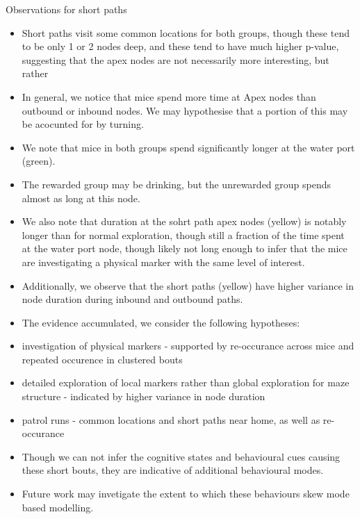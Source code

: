 Observations for short paths
\begin{itemize}
    \item Short paths visit some common locations for both groups, though these tend to be only 1 or 2 nodes deep, and these tend to have much higher p-value, suggesting that the apex nodes are not necessarily more interesting, but rather 
    \item In general, we notice that mice spend more time at Apex nodes than outbound or inbound nodes. We may hypothesise that a portion of this may be acocunted for by turning.
    \item We note that mice in both groups spend significantly longer at the water port (green).
    \item The rewarded group may be drinking, but the unrewarded group spends almost as long at this node.
    \item We also note that duration at the sohrt path apex nodes (yellow) is notably longer than for normal exploration, though still a fraction of the time spent at the water port node, though likely not long enough to infer that the mice are investigating a physical marker with the same level of interest.
    \item Additionally, we observe that the short paths (yellow) have higher variance in node duration during inbound and outbound paths. 
    \item The evidence accumulated, we consider the following hypotheses:
    \item investigation of physical markers - supported by re-occurance across mice and repeated occurence in clustered bouts
    \item detailed exploration of local markers rather than global exploration for maze structure - indicated by higher variance in node duration
    \item patrol runs - common locations and short paths near home, as well as re-occurance
    \item Though we can not infer the cognitive states and behavioural cues causing these short bouts, they are indicative of additional behavioural modes.
    \item Future work may invetigate the extent to which these behaviours skew mode based modelling.
\end{itemize}


